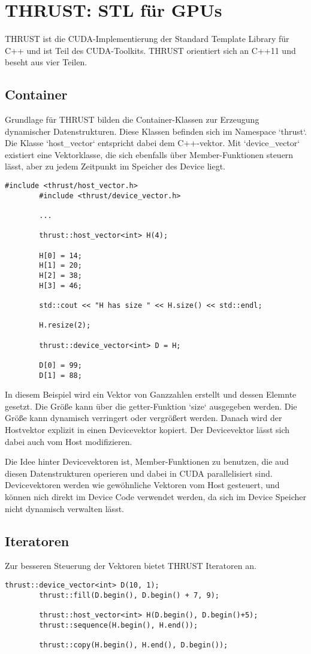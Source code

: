 	\section{THRUST: STL f\"ur GPUs}
	THRUST ist die CUDA-Implementierung der Standard Template Library für C++ und ist Teil des CUDA-Toolkits. THRUST orientiert sich an C++11 und beseht aus vier Teilen.
		
		\subsection{Container}
		Grundlage für THRUST bilden die Container-Klassen zur Erzeugung dynamischer Datenstrukturen. Diese Klassen befinden sich im Namespace \li`thrust`. Die Klasse \li`host_vector` entspricht dabei dem C++-vektor. Mit \li`device_vector` existiert eine Vektorklasse, die sich ebenfalls über Member-Funktionen steuern lässt, aber zu jedem Zeitpunkt im Speicher des Device liegt.
		\begin{lstlisting}[caption=THRUST Vektoren]
		#include <thrust/host_vector.h>
		#include <thrust/device_vector.h>

		...

		thrust::host_vector<int> H(4);

		H[0] = 14;
		H[1] = 20;
		H[2] = 38;
		H[3] = 46;

		std::cout << "H has size " << H.size() << std::endl;

		H.resize(2);

		thrust::device_vector<int> D = H;

		D[0] = 99;
		D[1] = 88;
		\end{lstlisting}
		
		In diesem Beispiel wird ein Vektor von Ganzzahlen erstellt und dessen Elemnte gesetzt. Die Größe kann über die getter-Funktion \li`size` ausgegeben werden. Die Größe kann dynamisch verringert oder vergrößert werden. Danach wird der Hostvektor explizit in einen Devicevektor kopiert. Der Devicevektor lässt sich dabei auch vom Host modifizieren.
		
		Die Idee hinter Devicevektoren ist, Member-Funktionen zu benutzen, die aud diesen Datenstrukturen operieren und dabei in CUDA parallelisiert sind. Devicevektoren werden wie gewöhnliche Vektoren vom Host gesteuert, und können nich direkt im Device Code verwendet werden, da sich im Device Speicher nicht dynamisch verwalten lässt.
		
		\subsection{Iteratoren}
		Zur besseren Steuerung der Vektoren bietet THRUST Iteratoren an.
		\begin{lstlisting}[caption=THRUST Iteratoren]
		thrust::device_vector<int> D(10, 1);
		thrust::fill(D.begin(), D.begin() + 7, 9);
		
		thrust::host_vector<int> H(D.begin(), D.begin()+5);
		thrust::sequence(H.begin(), H.end());
		
		thrust::copy(H.begin(), H.end(), D.begin());
		\end{lstlisting}
		
